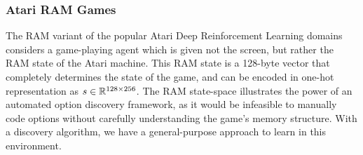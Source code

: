 



\subsubsection{Atari RAM Games}
The RAM variant of the popular Atari Deep Reinforcement Learning domains considers a game-playing agent which is given not the screen, but rather the RAM state of the Atari machine.
This RAM state is a 128-byte vector that completely determines the state of the game, and can be encoded in one-hot representation as $s\in\mathbb{R}^{128 \times 256}$.
The RAM state-space illustrates the power of an automated option discovery framework, as it would be infeasible to manually code options without carefully understanding the game's memory structure.
With a discovery algorithm, we have a general-purpose approach to learn in this environment.

